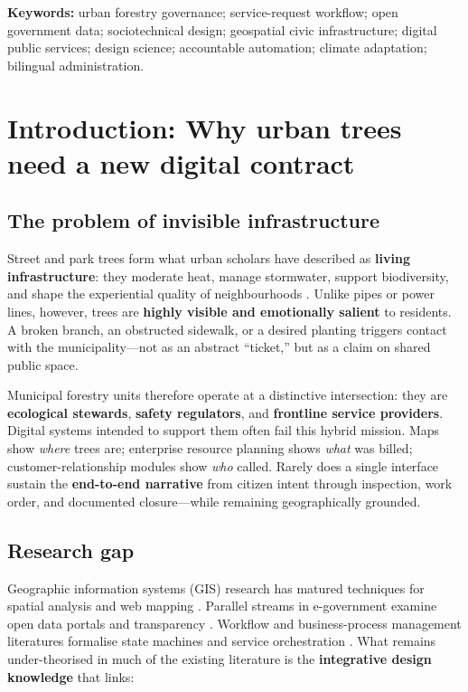 \documentclass[12pt,a4paper]{article}
\begin{document}
\noindent\textbf{Keywords:} urban forestry governance; service-request workflow; open government data; sociotechnical design; geospatial civic infrastructure; digital public services; design science; accountable automation; climate adaptation; bilingual administration.

\tableofcontents
\listoffigures
\newpage

\section{Introduction: Why urban trees need a new digital contract}
\label{sec:intro}

\subsection{The problem of invisible infrastructure}

Street and park trees form what urban scholars have described as \textbf{living infrastructure}: they moderate heat, manage stormwater, support biodiversity, and shape the experiential quality of neighbourhoods \cite{beatley2011,escobedo2011}. Unlike pipes or power lines, however, trees are \textbf{highly visible and emotionally salient} to residents. A broken branch, an obstructed sidewalk, or a desired planting triggers contact with the municipality---not as an abstract ``ticket,'' but as a claim on shared public space.

Municipal forestry units therefore operate at a distinctive intersection: they are \textbf{ecological stewards}, \textbf{safety regulators}, and \textbf{frontline service providers}. Digital systems intended to support them often fail this hybrid mission. Maps show \emph{where} trees are; enterprise resource planning shows \emph{what} was billed; customer-relationship modules show \emph{who} called. Rarely does a single interface sustain the \textbf{end-to-end narrative} from citizen intent through inspection, work order, and documented closure---while remaining geographically grounded.

\subsection{Research gap}

Geographic information systems (GIS) research has matured techniques for spatial analysis and web mapping \cite{goodchild2007}. Parallel streams in e-government examine open data portals and transparency \cite{janssen2012}. Workflow and business-process management literatures formalise state machines and service orchestration \cite{recker2016}. What remains under-theorised in much of the existing literature is the \textbf{integrative design knowledge} that links:
\end{document}

